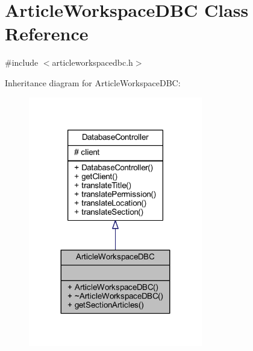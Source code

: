 \hypertarget{class_article_workspace_d_b_c}{}\section{Article\+Workspace\+D\+B\+C Class Reference}
\label{class_article_workspace_d_b_c}


{\ttfamily \#include $<$articleworkspacedbc.\+h$>$}



Inheritance diagram for Article\+Workspace\+D\+B\+C\+:
\nopagebreak
\begin{figure}[H]
\begin{center}
\leavevmode
\includegraphics[width=215pt]{class_article_workspace_d_b_c__inherit__graph}
\end{center}
\end{figure}


